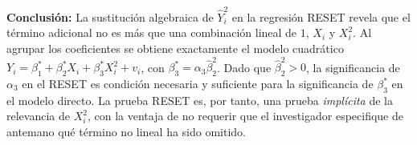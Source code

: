 \documentclass[12pt, letterpaper]{article}
\begin{document}
\begin{clave}
  \textbf{Conclusión:} La sustitución algebraica de $\hat{Y}_i^2$ en la
  regresión RESET revela que el término adicional no es más que una
  combinación lineal de $1$, $X_i$ y $X_i^2$. Al agrupar los coeficientes
  se obtiene exactamente el modelo cuadrático
  $Y_i = \beta_1^* + \beta_2^* X_i + \beta_3^* X_i^2 + v_i$,
  con $\beta_3^* = \alpha_3\hat{\beta}_2^2$.
  Dado que $\hat{\beta}_2^2 > 0$, la significancia de $\alpha_3$ en el
  RESET es condición necesaria y suficiente para la significancia de
  $\beta_3^*$ en el modelo directo. La prueba RESET es, por tanto, una
  prueba \emph{implícita} de la relevancia de $X_i^2$, con la ventaja
  de no requerir que el investigador especifique de antemano qué término
  no lineal ha sido omitido.
\end{clave}
\end{document}
